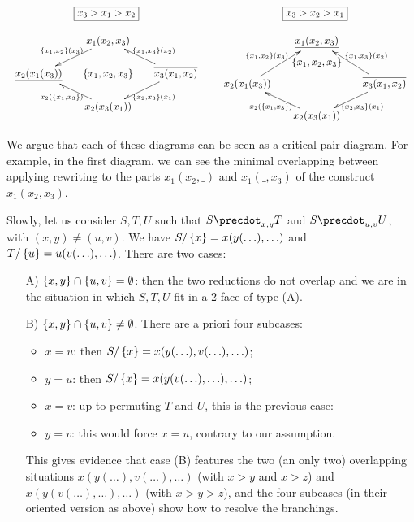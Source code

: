 $$\begin{array}{ccc}
\boxed{x_3>x_1>x_2} && \boxed{x_3>x_2>x_1}\\
&&\\
\xymatrix @-1.65pc {&& x_1(x_2,x_3) \ar @{->}[ddll]_{\set{x_1,x_2}(x_3)} \ar @{<-}[ddrr]^{\set{x_1,x_3}(x_2)}&& \\
&&&&\\
\underline{x_2(x_1(x_3))} \ar @{<-}[ddrr]_{x_2(\set{x_1,x_3})}&& \set{x_1,x_2,x_3}  && \overline{x_3(x_1,x_2)}\ar @{->}[ddll]^{\set{x_2,x_3}(x_1)}\\
&&&&\\
&&  x_2(x_3(x_1))&&}
&&


\xymatrix @-1.65pc {&& \underline{x_1(x_2,x_3)} \ar @{<-}[ddll]_{\set{x_1,x_2}(x_3)} \ar @{<-}[ddrr]^{\set{x_1,x_3}(x_2)}&& \\
&&\set{x_1,x_2,x_3}&&\\
x_2(x_1(x_3)) \ar @{<-}[ddrr]_{x_2(\set{x_1,x_3})}&&   && \overline{x_3(x_1,x_2)}\ar @{->}[ddll]^{\set{x_2,x_3}(x_1)}\\
&&&&\\
&&  x_2(x_3(x_1))&&}
  \end{array}
$$

We argue that each of these diagrams can be seen as a critical pair diagram. 
For example, in the first diagram, we can see the minimal overlapping between applying rewriting to the parts
$x_1(x_2,\_)$ and $x_1(\_,x_3)$ of the construct $x_1(x_2,x_3)$. 

Slowly, let us consider  $S,T,U$ such that $S\precdot_{x,y} T$ and $S\precdot_{u,v} U$, with  $(x,y)\neq(u,v)$.
We have
$S/\left\{x\right\}=x(y(\ldots),\ldots)$ and $T/\left\{u\right\}=u(v(\ldots),\ldots)$. There are two cases:
\begin{itemize}
\item[A)] $\left\{x,y\right\}\cap\left\{u,v\right\}=\emptyset$: then the two reductions do not overlap and we are in the situation in which $S,T,U$ fit in a 2-face of type (A).
\item[B)] $\left\{x,y\right\}\cap\left\{u,v\right\}\neq\emptyset$. There are a priori four subcases:
\begin{itemize}
\item $x=u$: then $S/\left\{x\right\}=x(y(\ldots),v(\ldots),\ldots)$;
\item $y=u$: then  $S/\left\{x\right\}=x(y(v(\ldots),\ldots),\ldots)$;
\item $x=v$: up to permuting $T$ and $U$, this is the previous case:
\item $y=v$: this would force $x=u$, contrary to our assumption.
\end{itemize}
This gives evidence that case (B) features the two (an only two) overlapping situations $x(y(\ldots),v(\ldots),\ldots)$ (with $x>y$ and $x>z$) and 
$x(y(v(\ldots),\ldots),\ldots)$ (with $x>y>z$), and the four subcases  (in their oriented version as above) show how to resolve the branchings.
\end{itemize}


